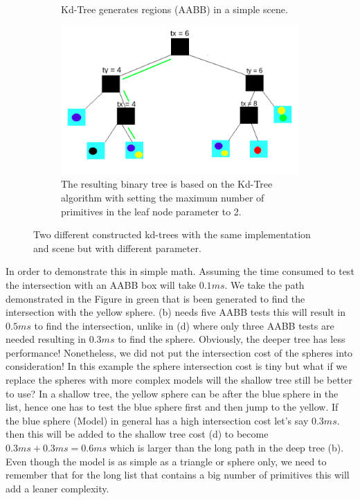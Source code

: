 \documentclass[11pt,a4paper]{article}
\begin{document}
\begin{figure}[H]
\begin{subfigure}[b]{0.3\textwidth}
         \caption{Kd-Tree generates regions (AABB) in a simple scene.}
         \label{fig:pi_5000}
     \end{subfigure}
     \hfill
     \begin{subfigure}[b]{0.6\textwidth}
         \centering
         \captionsetup{justification=centering}
         \includegraphics[width=\textwidth]{images/kdtree/visual_tree_2_green.png}
         \caption{The resulting binary tree is based on the Kd-Tree algorithm with setting the maximum number of primitives in the leaf node parameter to 2.
}
         \label{fig:pi_5000}
     \end{subfigure}
        \captionsetup{justification=centering,margin=2cm}
        \caption{Two different constructed kd-trees with the same implementation and scene but with different parameter.}
        \label{fig:three graphs}
\end{figure}

In order to demonstrate this in simple math. Assuming the time consumed to test the intersection with an AABB box will take $0.1ms$. We take the path demonstrated in the Figure in green that is been generated to find the intersection with the yellow sphere. (b) needs five AABB tests this will result in $0.5ms$ to find the intersection, unlike in (d) where only three AABB tests are needed resulting in $0.3ms$ to find the sphere. Obviously, the deeper tree has less performance! Nonetheless, we did not put the intersection cost of the spheres into consideration! In this example the sphere intersection cost is tiny but what if we replace the spheres with more complex models will the shallow tree still be better to use? In a shallow tree, the yellow sphere can be after the blue sphere in the list, hence one has to test the blue sphere first and then jump to the yellow. If the blue sphere (Model) in general has a high intersection cost let's say $0.3ms$. then this will be added to the shallow tree cost (d) to become $0.3ms + 0.3ms = 0.6ms$ which is larger than the long path in the deep tree (b). Even though the model is as simple as a triangle or sphere only, we need to remember that for the long list that contains a big number of primitives this will add a leaner complexity.
\\
\noindent
\end{document}
